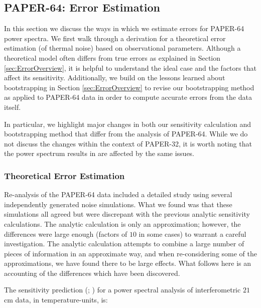 \documentclass[preprint2,numberedappendix,tighten]{aastex6}  %
\begin{document}

\subsection{PAPER-64: Error Estimation}
\label{sec:Error}

In this section we discuss the ways in which we estimate errors for PAPER-64 power spectra. We first walk through a derivation 
for a theoretical error estimation (of thermal noise) based on observational parameters. Although a theoretical model often 
differs from true errors as explained in Section \ref{sec:ErrorOverview}, it is helpful to understand the ideal case and the factors 
that affect its sensitivity. Additionally, we build on the lessons learned about bootstrapping in Section \ref{sec:ErrorOverview} to 
revise our bootstrapping method as applied to PAPER-64 data in order to compute accurate errors from the data itself.

In particular, we highlight major changes in both our sensitivity calculation and bootstrapping method that differ from the  
analysis of PAPER-64. While we do not discuss the changes within the context of PAPER-32, it is worth noting that the power 
spectrum results in \citet{parsons_et_al2014} are affected by the same issues.

\subsubsection{Theoretical Error Estimation}
\label{sec:PSSense}

Re-analysis of the PAPER-64 data included a detailed study using several independently generated noise simulations. What we 
found was that these simulations all agreed but were discrepant with the previous analytic sensitivity calculations. The analytic 
calculation is only an approximation; however, the differences were large enough (factors of $10$ in some cases) to warrant a 
careful investigation. The analytic calculation attempts to combine a large number of pieces of information in an approximate 
way, and when re-considering some of the approximations, we have found there to be large effects. What follows here is an 
accounting of the differences which have been discovered.

The sensitivity prediction (\citealt{parsons_et_al2012a}; \citealt{pober_et_al2013}) for a power spectral analysis of 
interferometric $21$ cm data, in temperature-units, is:
\end{document}
